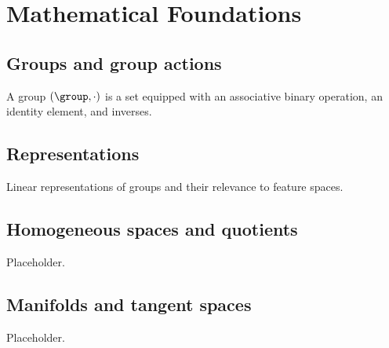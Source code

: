 \chapter{Mathematical Foundations}
\label{ch:foundations}

\section{Groups and group actions}
\begin{definition}[Group]
A group $(\group, \cdot)$ is a set equipped with an associative binary
operation, an identity element, and inverses.
\end{definition}

\section{Representations}
Linear representations of groups and their relevance to feature spaces.

\section{Homogeneous spaces and quotients}
Placeholder.

\section{Manifolds and tangent spaces}
Placeholder.
